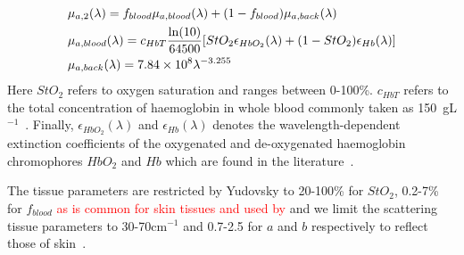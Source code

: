 \begin{equation}
\begin{aligned}
    & \mu_{a, 2}(\lambda) = f_{blood} \mu_{a, blood}(\lambda) + (1 - f_{blood})\mu_{a, back}(\lambda) \\
    & \mu_{a, blood}(\lambda) = c_{HbT}\frac{\ln(10)}{64500}\large[StO_2 \epsilon_{HbO_2}(\lambda) + (1 - StO_2)\epsilon_{Hb}(\lambda)\large] \\
    & \mu_{a, back}(\lambda) = 7.84\times10^8 \lambda^{-3.255}
\end{aligned}
\label{eq:mua2}
\end{equation}
Here $StO_2$ refers to oxygen saturation
and ranges between 0-100\%.
$c_{HbT}$ refers to the total concentration of haemoglobin in whole blood commonly taken as 150~gL$^{-1}$~\citep{Prahl1999}.
Finally, $\epsilon_{HbO_2}(\lambda)$ and $\epsilon_{Hb}(\lambda)$ denotes the wavelength-dependent extinction coefficients of the oxygenated and de-oxygenated haemoglobin chromophores $HbO_2$ and $Hb$ which are found in the literature~\citep{Prahl1999}. 

The tissue parameters are restricted by Yudovsky to 20-100\% for $StO_2$, 0.2-7\% for $f_{blood}$ \textcolor{red}{as is common for skin tissues and used by \citet{Yudovsky2011a}} and we limit the scattering tissue parameters to 30-70cm$^{-1}$ and 0.7-2.5 for $a$ and $b$ respectively to reflect those of skin~\citep{Jacques2013}. 


